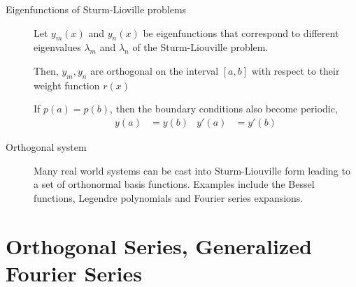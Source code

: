 \begin{description}
    \item[Eigenfunctions of Sturm-Lioville problems] Let $ y_m(x) $ and $ y_n(x) $ be
        eigenfunctions that correspond to different eigenvalues $ \lambda_m $ and
        $ \lambda_n $ of the Sturm-Liouville problem. \par
        Then, $ y_m, y_n $ are orthogonal on the interval $ [a, b] $ with respect to
        their weight function $ r(x) $ \par
        If $ p(a) = p(b) $, then the boundary conditions also become periodic,
        \begin{align}
            y(a) & = y(b) & y'(a) & = y'(b)
        \end{align}

    \item[Orthogonal system] Many real world systems can be cast into Sturm-Liouville
        form leading to a set of orthonormal basis functions. Examples include the Bessel
        functions, Legendre polynomials and Fourier series expansions.
\end{description}

\section{Orthogonal Series, Generalized Fourier Series}


